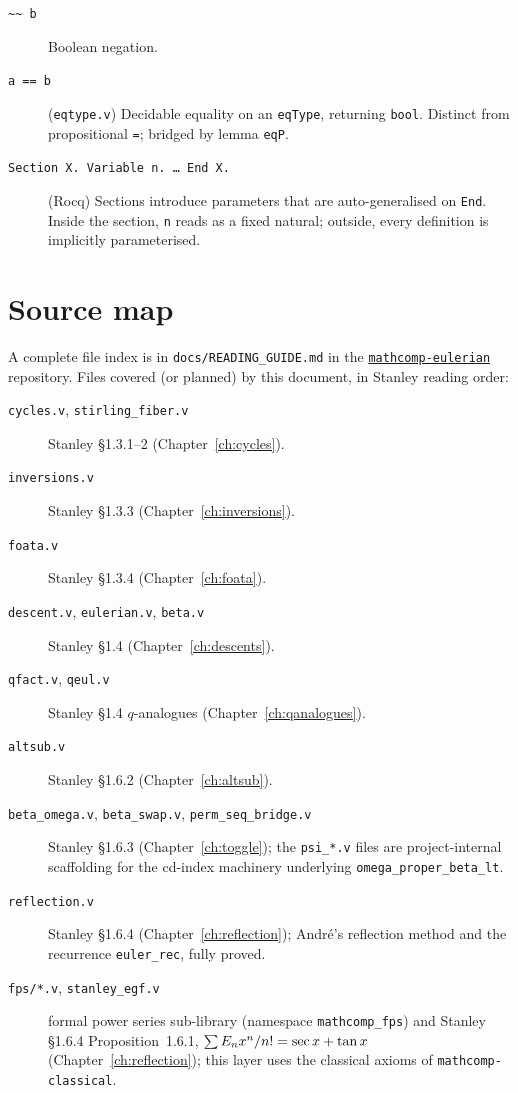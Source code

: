 \begin{description}
  \item[\texttt{\textasciitilde\textasciitilde\,b}] Boolean negation.

  \item[\texttt{a\,==\,b}] (\texttt{eqtype.v}) Decidable equality
    on an \texttt{eqType}, returning \texttt{bool}. Distinct from
    propositional \texttt{=}; bridged by lemma \texttt{eqP}.

  \item[\texttt{Section X.\,Variable n.\,\ldots\,End X.}] (Rocq)
    Sections introduce parameters that are auto-generalised on
    \texttt{End}. Inside the section, \texttt{n} reads as a fixed
    natural; outside, every definition is implicitly parameterised.
\end{description}

\chapter{Source map}

A complete file index is in \texttt{docs/READING\_GUIDE.md} in the
\href{https://github.com/LLM4Rocq/mathcomp-eulerian}{\texttt{mathcomp-eulerian}}
repository. Files covered (or planned) by this document, in Stanley
reading order:

\begin{description}
  \item[\texttt{cycles.v}, \texttt{stirling\_fiber.v}]
    Stanley \S1.3.1--2 (Chapter~\ref{ch:cycles}).
  \item[\texttt{inversions.v}] Stanley \S1.3.3
    (Chapter~\ref{ch:inversions}).
  \item[\texttt{foata.v}] Stanley \S1.3.4
    (Chapter~\ref{ch:foata}).
  \item[\texttt{descent.v}, \texttt{eulerian.v}, \texttt{beta.v}]
    Stanley \S1.4 (Chapter~\ref{ch:descents}).
  \item[\texttt{qfact.v}, \texttt{qeul.v}] Stanley \S1.4 $q$-analogues
    (Chapter~\ref{ch:qanalogues}).
  \item[\texttt{altsub.v}] Stanley \S1.6.2
    (Chapter~\ref{ch:altsub}).
  \item[\texttt{beta\_omega.v}, \texttt{beta\_swap.v}, \texttt{perm\_seq\_bridge.v}]
    Stanley \S1.6.3 (Chapter~\ref{ch:toggle}); the
    \texttt{psi\_*.v} files are project-internal scaffolding for
    the cd-index machinery underlying
    \texttt{omega\_proper\_beta\_lt}.
  \item[\texttt{reflection.v}] Stanley \S1.6.4
    (Chapter~\ref{ch:reflection}); Andr\'e's reflection method and
    the recurrence \texttt{euler\_rec}, fully proved.
  \item[\texttt{fps/*.v}, \texttt{stanley\_egf.v}] formal power
    series sub-library (namespace \texttt{mathcomp\_fps}) and
    Stanley \S1.6.4 Proposition~1.6.1,
    $\sum E_n x^n/n! = \sec x + \tan x$
    (Chapter~\ref{ch:reflection}); this layer uses the classical
    axioms of \texttt{mathcomp-classical}.
\end{description}


